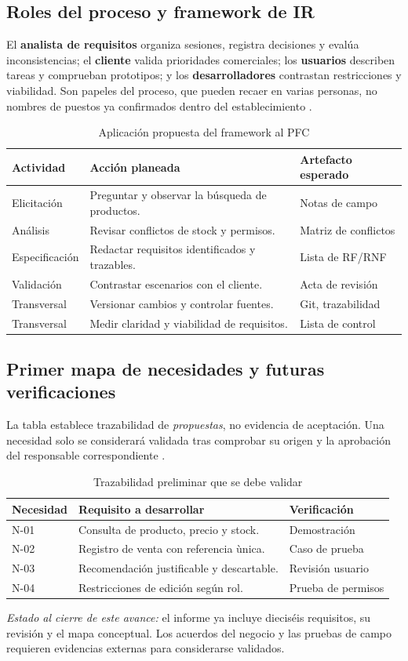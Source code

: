 \subsection{Roles del proceso y framework de IR}
El \textbf{analista de requisitos} organiza sesiones, registra decisiones y eval\'ua inconsistencias; el \textbf{cliente} valida prioridades comerciales; los \textbf{usuarios} describen tareas y comprueban prototipos; y los \textbf{desarrolladores} contrastan restricciones y viabilidad. Son papeles del proceso, que pueden recaer en varias personas, no nombres de puestos ya confirmados dentro del establecimiento \cite{iso29148,pohl2025}.

\begin{table}[!ht]
\centering\scriptsize
\caption{Aplicaci\'on propuesta del framework al PFC}
\label{tab:framework}
\begin{tabularx}{\columnwidth}{@{}P{1.45cm}Y P{1.35cm}@{}}
\toprule Actividad & Acci\'on planeada & Artefacto esperado\\\midrule
Elicitaci\'on & Preguntar y observar la b\'usqueda de productos. & Notas de campo\\
An\'alisis & Revisar conflictos de stock y permisos. & Matriz de conflictos\\
Especificaci\'on & Redactar requisitos identificados y trazables. & Lista de RF/RNF\\
Validaci\'on & Contrastar escenarios con el cliente. & Acta de revisi\'on\\
\midrule
Transversal & Versionar cambios y controlar fuentes. & Git, trazabilidad\\
Transversal & Medir claridad y viabilidad de requisitos. & Lista de control\\
\bottomrule
\end{tabularx}
\end{table}

\subsection{Primer mapa de necesidades y futuras verificaciones}
La tabla establece trazabilidad de \emph{propuestas}, no evidencia de aceptaci\'on. Una necesidad solo se considerar\'a validada tras comprobar su origen y la aprobaci\'on del responsable correspondiente \cite{iso29148}.
\begin{table}[!ht]
\centering\scriptsize
\caption{Trazabilidad preliminar que se debe validar}
\label{tab:traza}
\begin{tabularx}{\columnwidth}{@{}P{0.95cm}Y P{1.25cm}@{}}
\toprule Necesidad & Requisito a desarrollar & Verificación\\\midrule
N-01 & Consulta de producto, precio y stock. & Demostraci\'on\\
N-02 & Registro de venta con referencia \`unica. & Caso de prueba\\
N-03 & Recomendaci\'on justificable y descartable. & Revisi\'on usuario\\
N-04 & Restricciones de edici\'on seg\'un rol. & Prueba de permisos\\
\bottomrule
\end{tabularx}
\end{table}

\noindent\textit{Estado al cierre de este avance:} el informe ya incluye dieciséis requisitos, su revisión y el mapa conceptual. Los acuerdos del negocio y las pruebas de campo requieren evidencias externas para considerarse validados.
